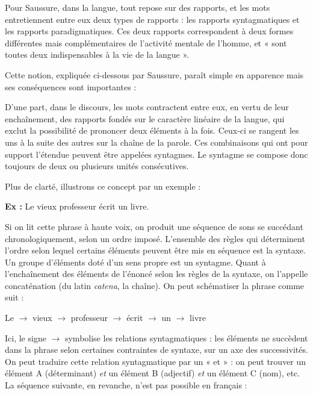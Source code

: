 \begin{lecture}{}
Pour Saussure, dans la langue, tout repose sur des rapports, et les mots entretiennent entre eux deux types de rapports : les rapports syntagmatiques et les rapports paradigmatiques. Ces deux rapports correspondent à deux formes différentes mais complémentaires de l’activité mentale de l’homme, et « sont toutes deux indispensables à la vie de la langue ».
\end{lecture}

Cette notion, expliquée ci-dessous par Saussure, paraît simple en apparence mais ses conséquences sont importantes :
\begin{lecture}{}
D’une part, dans le discours, les mots contractent entre eux, en vertu de leur enchaînement, des rapports fondés sur le caractère linéaire de la langue, qui exclut la possibilité de prononcer deux éléments à la fois. Ceux-ci se rangent les uns à la suite des autres sur la chaîne de la parole. Ces combinaisons qui ont pour support l’étendue peuvent être appelées syntagmes. Le syntagme se compose donc toujours de deux ou plusieurs unités consécutives.
\end{lecture}

Plus de clarté, illustrons ce concept par un exemple :

\noindent\textbf{Ex :} Le vieux professeur écrit un livre.

Si on lit cette phrase à haute voix, on produit une séquence de sons se succédant chronologiquement, selon un ordre imposé. L’ensemble des règles qui déterminent l’ordre selon lequel certains éléments peuvent être mis en séquence est la syntaxe. Un groupe d’éléments doté d’un sens propre est un syntagme. Quant à l’enchaînement des éléments de l’énoncé selon les règles de la syntaxe, on l’appelle concaténation (du latin \textit{catena}, la chaîne). On peut schématiser la phrase comme suit :

\noindent Le $\to$ vieux $\to$ professeur $\to$ écrit $\to$ un $\to$ livre

Ici, le signe $\to$ symbolise les relations syntagmatiques : les éléments ne succèdent dans la phrase selon certaines contraintes de syntaxe, sur un axe des successivités. On peut traduire cette relation syntagmatique par un « et » : on peut trouver un élément A (déterminant) \textit{et} un élément B (adjectif) \textit{et} un élément C (nom), etc. La séquence suivante, en revanche, n’est pas possible en français :

